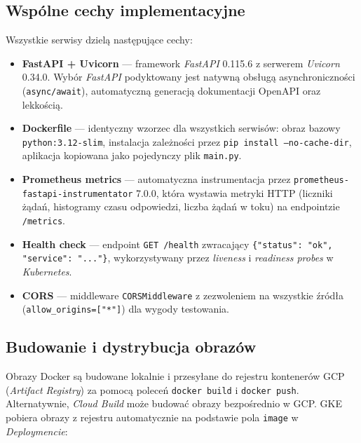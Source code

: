 \subsection{Wspólne cechy implementacyjne}

Wszystkie serwisy dzielą następujące cechy:

\begin{itemize}
  \item \textbf{FastAPI + Uvicorn} — framework \textit{FastAPI} 0.115.6 z serwerem \textit{Uvicorn} 0.34.0. Wybór \textit{FastAPI} podyktowany jest natywną obsługą asynchroniczności (\texttt{async/await}), automatyczną generacją dokumentacji OpenAPI oraz lekkością.
  \item \textbf{Dockerfile} — identyczny wzorzec dla wszystkich serwisów: obraz bazowy \texttt{python:3.12-slim}, instalacja zależności przez \texttt{pip install --no-cache-dir}, aplikacja kopiowana jako pojedynczy plik \texttt{main.py}.
  \item \textbf{Prometheus metrics} — automatyczna instrumentacja przez \texttt{prometheus-fastapi-instrumentator} 7.0.0, która wystawia metryki HTTP (liczniki żądań, histogramy czasu odpowiedzi, liczba żądań w toku) na endpointzie \texttt{/metrics}.
  \item \textbf{Health check} — endpoint \texttt{GET /health} zwracający \texttt{\{"status": "ok", "service": "..."\}}, wykorzystywany przez \textit{liveness} i \textit{readiness probes} w \textit{Kubernetes}.
  \item \textbf{CORS} — middleware \texttt{CORSMiddleware} z zezwoleniem na wszystkie źródła (\texttt{allow\_origins=["*"]}) dla wygody testowania.
\end{itemize}



\subsection{Budowanie i dystrybucja obrazów}

Obrazy Docker są budowane lokalnie i przesyłane do rejestru kontenerów GCP (\textit{Artifact Registry}) za pomocą poleceń \texttt{docker build} i \texttt{docker push}. Alternatywnie, \textit{Cloud Build} może budować obrazy bezpośrednio w GCP. GKE pobiera obrazy z rejestru automatycznie na podstawie pola \texttt{image} w \textit{Deploymencie}:

